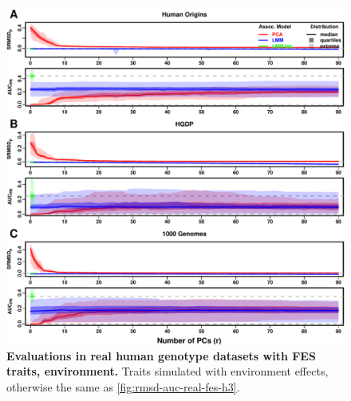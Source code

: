 \documentclass[11pt]{article}
\begin{document}
\begin{figure}[hp!]
  \centering
  \includegraphics[width=\textwidth,height=\textheight,keepaspectratio]{fes/m_causal_fac-27/h0.3/env0.3-0.2/rmsd-auc-real.pdf}
  \caption{
    {\bf Evaluations in real human genotype datasets with FES traits, environment.}
    Traits simulated with environment effects, otherwise the same as \cref{fig:rmsd-auc-real-fes-h3}.
  }
  \label{fig:rmsd-auc-real-fes-env}
\end{figure}
\end{document}
